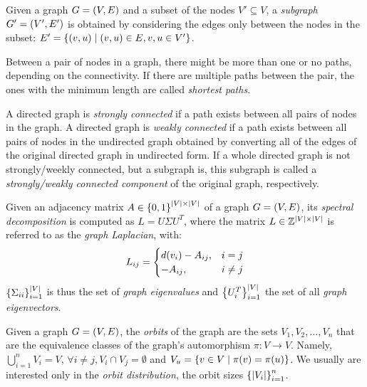 \begin{definition}
Given a graph $G=\mathopen{}\left(V, E\right)$ and a subset of the nodes $V' \subseteq V$, a \emph{subgraph} $G'=\mathopen{}\left(V', E'\right)$ is obtained by considering the edges only between the nodes in the subset: $E' = \mathopen{}\left\{\mathopen{}\left(v, u\right) \mid \mathopen{}\left(v, u\right) \in E, v,u \in V'\right\}$.
\end{definition}

\begin{definition}
Between a pair of nodes in a graph, there might be more than one or no paths, depending on the connectivity. If there are multiple paths between the pair, the ones with the minimum length are called \emph{shortest paths}.
\end{definition}

\begin{definition}
A directed graph is \emph{strongly connected} if a path exists between all pairs of nodes in the graph. A directed graph is \emph{weakly connected} if a path exists between all pairs of nodes in the undirected graph obtained by converting all of the edges of the original directed graph in undirected form. If a whole directed graph is not strongly/weekly connected, but a subgraph is, this subgraph is called a \emph{strongly/weakly connected component} of the original graph, respectively.
\end{definition}

\begin{definition}
    Given an adjacency matrix $A \in \mathopen{}\left\{0,1\right\}^{\mathopen{}\left|V\right|\times\mathopen{}\left|V\right|}$ of a graph $G=\mathopen{}\left(V, E\right)$, its \emph{spectral decomposition} is computed as $L=U \Sigma U^T$, where the matrix $L\in\mathbb{Z}^{\mathopen{}\left|V\right|\times\mathopen{}\left|V\right|}$ is referred to as the \emph{graph Laplacian}, with: 
    \begin{equation}
        L_{ij}=\begin{cases}
            d\mathopen{}\left(v_i\right)-A_{ij}, & i=j \\
            -A_{ij}, & i\neq j
        \end{cases}
    \end{equation}
    $\mathopen{}\left\{\Sigma_{ii}\right\}_{i=1}^{\mathopen{}\left|V\right|}$ is thus the set of \emph{graph eigenvalues} and $\mathopen{}\left\{U^T_{i}\right\}_{i=1}^{\mathopen{}\left|V\right|}$ the set of all \emph{graph eigenvectors}.
\end{definition}

\begin{definition}
    Given a graph $G=\mathopen{}\left(V,E\right)$, the \emph{orbits} of the graph are the sets $V_1,V_2,\dots,V_n$ that are the equivalence classes of the graph's automorphism $\pi:V \to V$. Namely, $\bigcup_{i=1}^{n}{V_i}=V$, $\forall i\neq j, V_i \cap V_j=\emptyset$ and $V_u=\mathopen{}\left\{v \in V \mid \pi\mathopen{}\left(v\right)=\pi\mathopen{}\left(u\right)\right\}$. We usually are interested only in the \emph{orbit distribution}, the orbit sizes $\mathopen{}\left\{\mathopen{}\left|V_i\right|\right\}_{i=1}^{n}$.
\end{definition}

